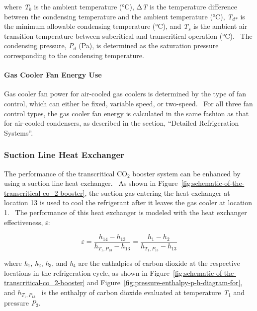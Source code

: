 where \emph{T\(_{b}\)} is the ambient temperature (°C), Δ\emph{T} is the temperature difference between the condensing temperature and the ambient temperature (°C), \emph{T\(_{d}\)}\(_{*}\) is the minimum allowable condensing temperature (°C), and \emph{T\(_{s}\)} is the ambient air transition temperature between subcritical and transcritical operation (°C).~ The condensing pressure, \emph{P\(_{d}\)} (Pa), is determined as the saturation pressure corresponding to the condensing temperature.

\paragraph{Gas Cooler Fan Energy Use}\label{gas-cooler-fan-energy-use}

Gas cooler fan power for air-cooled gas coolers is determined by the type of fan control, which can either be fixed, variable speed, or two-speed.~ For all three fan control types, the gas cooler fan energy is calculated in the same fashion as that for air-cooled condensers, as described in the section, ``Detailed Refrigeration Systems''.

\subsubsection{Suction Line Heat Exchanger}\label{suction-line-heat-exchanger}

The performance of the transcritical CO\(_{2}\) booster system can be enhanced by using a suction line heat exchanger.~ As shown in Figure~\ref{fig:schematic-of-the-transcritical-co_2-booster}, the suction gas entering the heat exchanger at location 13 is used to cool the refrigerant after it leaves the gas cooler at location 1.~ The performance of this heat exchanger is modeled with the heat exchanger effectiveness, ε:

\begin{equation}
\varepsilon  = \frac{{{h_{14}} - {h_{13}}}}{{{h_{{T_1},{P_{13}}}} - {h_{13}}}} = \frac{{{h_1} - {h_2}}}{{{h_{{T_1},{P_{13}}}} - {h_{13}}}}
\end{equation}

where \emph{h}\(_{1}\), \emph{h}\(_{2}\), \emph{h}\(_{3}\), and \emph{h}\(_{4}\) are the enthalpies of carbon dioxide at the respective locations in the refrigeration cycle, as shown in Figure~\ref{fig:schematic-of-the-transcritical-co_2-booster} and Figure~\ref{fig:pressure-enthalpy-p-h-diagram-for}, and \({h_{{T_1},{P_{13}}}}\) ~is the enthalpy of carbon dioxide evaluated at temperature \emph{T}\(_{1}\) and pressure \emph{P}\(_{3}\).


